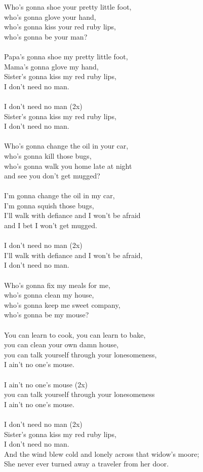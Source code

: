 \documentclass[twoside,13pt,openany,letterpaper]{memoir}%
\begin{document}

Who's gonna shoe your pretty little foot,\\
who's gonna glove your hand,\\
who's gonna kiss your red ruby lips,\\
who's gonna be your man?\\
\\
Papa's gonna shoe my pretty little foot,\\
Mama's gonna glove my hand,\\
Sister's gonna kiss my red ruby lips,\\
I don't need no man.\\
\\
I don't need no man (2x)\\
Sister's gonna kiss my red ruby lips,\\
I don't need no man.\\
\\
Who's gonna change the oil in your car,\\
who's gonna kill those bugs,\\
who's gonna walk you home late at night\\
and see you don't get mugged?\\
\\
I'm gonna change the oil in my car,\\
I'm gonna squish those bugs,\\
I'll walk with defiance and I won't be afraid\\
and I bet I won't get mugged.\\
\\
I don't need no man (2x)\\
I'll walk with defiance and I won't be afraid,\\
I don't need no man.\\
\\
Who's gonna fix my meals for me,\\
who's gonna clean my house,\\
who's gonna keep me sweet company,\\
who's gonna be my mouse?\\
\\
You can learn to cook, you can learn to bake,\\
you can clean your own damn house,\\
you can talk yourself through your lonesomeness,\\
I ain't no one's mouse.\\
\\
I ain't no one's mouse (2x)\\
you can talk yourself through your lonesomeness\\
I ain't no one's mouse.\\
\\
I don't need no man (2x)\\
Sister's gonna kiss my red ruby lips,\\
I don't need no man.\\

\chorusmarker
And the wind blew cold and lonely across that widow’s moore;\\
She never ever turned away a traveler from her door.

\clearpage%
\printindex%
\end{document}
